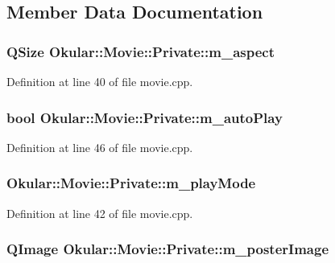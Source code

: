 \subsection{Member Data Documentation}
\hypertarget{classMovie_1_1Private_a3af3868607b59bacaa1ec3d999e44a71}{
\subsubsection[{m\+\_\+aspect}]{\setlength{\rightskip}{0pt plus 5cm}Q\+Size Okular\+::\+Movie\+::\+Private\+::m\+\_\+aspect}}\label{classMovie_1_1Private_a3af3868607b59bacaa1ec3d999e44a71}


Definition at line 40 of file movie.\+cpp.

\hypertarget{classMovie_1_1Private_a2877e4e03e5b0bb2af911834dc4363db}{
\subsubsection[{m\+\_\+auto\+Play}]{\setlength{\rightskip}{0pt plus 5cm}bool Okular\+::\+Movie\+::\+Private\+::m\+\_\+auto\+Play}}\label{classMovie_1_1Private_a2877e4e03e5b0bb2af911834dc4363db}


Definition at line 46 of file movie.\+cpp.

\hypertarget{classMovie_1_1Private_ab418a34a68536a04613e37bf8711f783}{
\subsubsection[{m\+\_\+play\+Mode}]{ Okular\+::\+Movie\+::\+Private\+::m\+\_\+play\+Mode}}\label{classMovie_1_1Private_ab418a34a68536a04613e37bf8711f783}


Definition at line 42 of file movie.\+cpp.

\hypertarget{classMovie_1_1Private_a010b7491e1f102a2db84e1b575b7de58}{
\subsubsection[{m\+\_\+poster\+Image}]{\setlength{\rightskip}{0pt plus 5cm}Q\+Image Okular\+::\+Movie\+::\+Private\+::m\+\_\+poster\+Image}}\label{classMovie_1_1Private_a010b7491e1f102a2db84e1b575b7de58}


